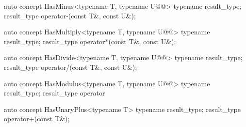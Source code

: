 \documentclass[american,twoside]{book}
\begin{document}
\begin{itemdescr}
\pnum
{}
\end{itemdescr}

\begin{itemdecl}
auto concept HasMinus<typename T, typename U@@> {
  typename result_type;
  result_type operator-(const T&, const U&);
}
\end{itemdecl}

\begin{itemdescr}
\pnum
{}
\end{itemdescr}

\begin{itemdecl}
auto concept HasMultiply<typename T, typename U@@> {
  typename result_type;
  result_type operator*(const T&, const U&);
}
\end{itemdecl}

\begin{itemdescr}
\pnum
{}
\end{itemdescr}

\begin{itemdecl}
auto concept HasDivide<typename T, typename U@@> {
  typename result_type;
  result_type operator/(const T&, const U&);
}
\end{itemdecl}

\begin{itemdescr}
\pnum
{}
\end{itemdescr}

\begin{itemdecl}
auto concept HasModulus<typename T, typename U@@> {
  typename result_type;
  result_type operator%
}
\end{itemdecl}

\begin{itemdescr}
\pnum
{}
\end{itemdescr}

\begin{itemdecl}
auto concept HasUnaryPlus<typename T> {
  typename result_type;
  result_type operator+(const T&);
}
\end{itemdecl}
\end{document}
